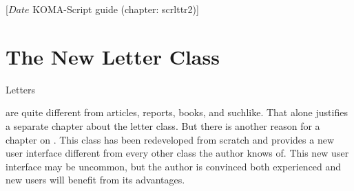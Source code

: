 %
%
%
%
%
%
%
%
% 
%
%
%
%

%
                 [$Date$
                  KOMA-Script guide (chapter: scrlttr2)]



\chapter{The New Letter Class }

%
\iffalse
  Since the June 2002 release {\KOMAScript} provides a completely
  rewritten letter class\ChangedAt{v2.8q}{\Class{scrlttr2}}. Although
  part of the code is identical to that of the main classes described
  in \autoref{cha:maincls}, letters
\else
  Letters
\fi
are quite different from articles,
reports, books, and suchlike.  That alone justifies a separate
chapter about the letter class. But there is another reason for a
chapter on . This class has been redeveloped from
scratch and provides a new user interface different from every other
class the author knows of. This new user interface may be uncommon,
but the author is convinced both experienced and new {\KOMAScript}
users will benefit from its advantages.


